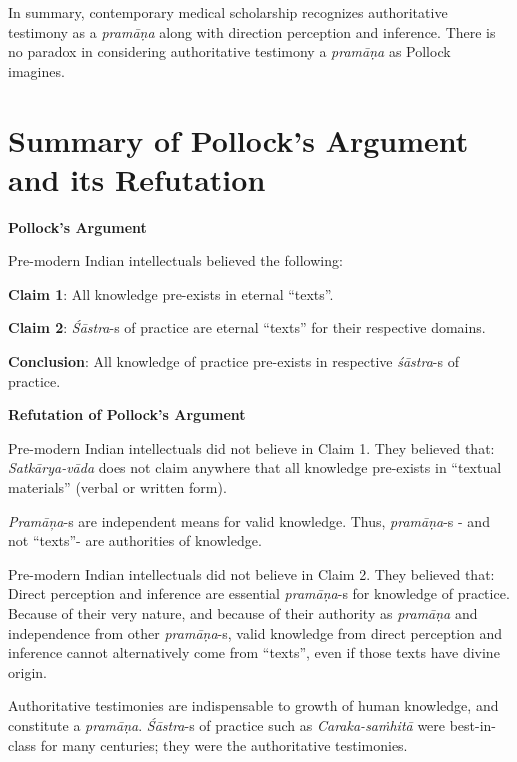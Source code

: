 In summary, contemporary medical scholarship recognizes authoritative testimony as a {\sl pramāṇa} along with direction perception and inference. There is no paradox in considering authoritative testimony a {\sl pramāṇa} as Pollock imagines.\\[-17pt]

\section*{Summary of Pollock's Argument and its Refutation}

{\bf Pollock's Argument}

Pre-modern Indian intellectuals believed the following:

{\bf Claim 1}: All knowledge pre-exists in eternal ``texts''.  

{\bf Claim 2}: {\sl Śāstra}-s of practice are eternal ``texts'' for their respective domains.

{\bf Conclusion}:  All knowledge of practice pre-exists in respective {\sl śāstra}-s of practice. 

\newpage

{\bf Refutation of Pollock's Argument}

Pre-modern Indian intellectuals did not believe in Claim 1.  They believed that:
\textsl{Satkārya-vāda} does not claim anywhere that all knowledge pre-exists in ``textual materials'' (verbal or written form).

\textsl{Pramāņa}-s are independent means for valid knowledge. Thus, {\sl pramāṇa}-s - and not ``texts''- are authorities of knowledge.

Pre-modern Indian intellectuals did not believe in Claim 2.  They believed that:
Direct perception and inference are essential \hbox{{\sl pramāṇa}-s} for knowledge of practice.  Because of their very nature, and because of their authority as {\sl pramāṇa} and independence from other \hbox{{\sl pramāṇa}-s}, valid knowledge from direct perception and inference cannot alternatively come from ``texts'', even if those texts have divine origin.

Authoritative testimonies are indispensable to growth of human knowledge, and constitute a {\sl pramāṇa}.  {\sl Śāstra}-s of practice such as {\sl Caraka-saṁhitā} were best-in-class for many centuries; they were the authoritative testimonies.

